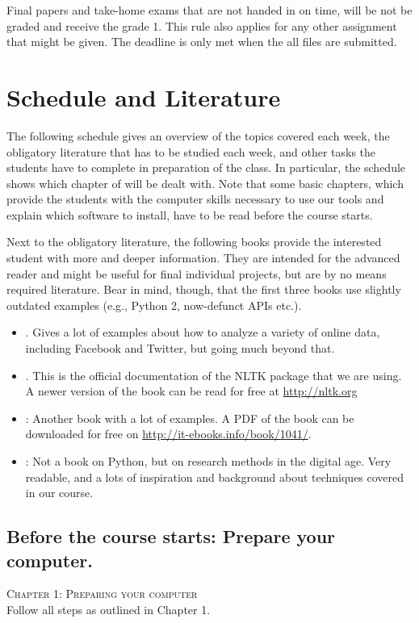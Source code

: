 \documentclass[a4paper,10pt]{report}
\begin{document}
Final papers and take-home exams that are not handed in on time, will be not be graded and receive the grade 1. This rule also applies for any other assignment that might be given. The deadline is only met when the all files are submitted.


 
 
 
\chapter{Schedule and Literature}

The following schedule gives an overview of the topics covered each week, the obligatory literature that has to be studied each week, and other tasks the students have to complete in preparation of the class.
In particular, the schedule shows which chapter of \cite{Trilling2016} will be dealt with. Note that some basic chapters, which provide the students with the computer skills necessary to use our tools and explain which software to install, have to be read before the course starts.

Next to the obligatory literature, the following books provide the interested student with more and deeper information. They are intended for the advanced reader and might be useful for final individual projects, but are by no means required literature. Bear in mind, though, that the first three books use slightly outdated examples (e.g., Python 2, now-defunct APIs etc.).

\begin{itemize}
\item \citealp{Russel2013}. Gives a lot of examples about how to analyze a variety of online data, including Facebook and Twitter, but going much beyond that.
\item \citealp{Bird2009}. This is the official documentation of the NLTK package that we are using. A newer version of the book can be read for free at \url{http://nltk.org}
\item \citealp{McKinney2012}: Another book with a lot of examples. A PDF of the book can be downloaded for free on \url{http://it-ebooks.info/book/1041/}.
\item \citealp{Salganik2017}: Not a book on Python, but on research methods in the digital age. Very readable, and a lots of inspiration and background about techniques covered in our course.
\end{itemize}



\section*{Before the course starts: Prepare your computer.}
\textsc{ Chapter 1: Preparing your computer}\\
Follow all steps as outlined in Chapter 1.
\end{document}
